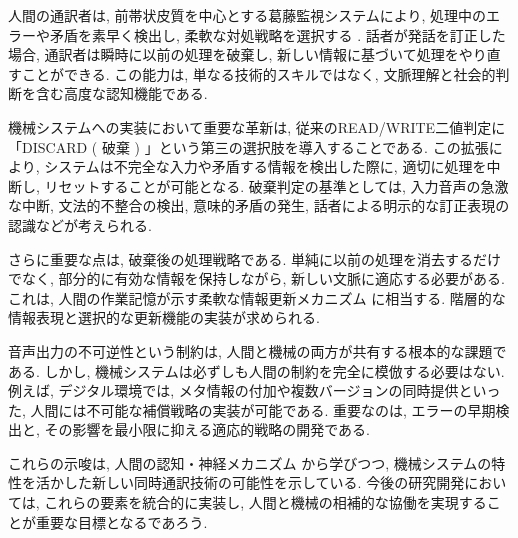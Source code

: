 人間の通訳者は, 前帯状皮質を中心とする葛藤監視システムにより, 処理中のエラーや矛盾を素早く検出し, 柔軟な対処戦略を選択する \cite{hervais2015fmri}.
話者が発話を訂正した場合, 通訳者は瞬時に以前の処理を破棄し, 新しい情報に基づいて処理をやり直すことができる.
この能力は, 単なる技術的スキルではなく, 文脈理解と社会的判断を含む高度な認知機能である.

機械システムへの実装において重要な革新は, 従来のREAD/WRITE二値判定に「DISCARD ( 破棄 ) 」という第三の選択肢を導入することである.
この拡張により, システムは不完全な入力や矛盾する情報を検出した際に, 適切に処理を中断し, リセットすることが可能となる.
破棄判定の基準としては, 入力音声の急激な中断, 文法的不整合の検出, 意味的矛盾の発生, 話者による明示的な訂正表現の認識などが考えられる.

さらに重要な点は, 破棄後の処理戦略である.
単純に以前の処理を消去するだけでなく, 部分的に有効な情報を保持しながら, 新しい文脈に適応する必要がある.
これは, 人間の作業記憶が示す柔軟な情報更新メカニズム \cite{baddeley2000episodic} に相当する.
階層的な情報表現と選択的な更新機能の実装が求められる.

音声出力の不可逆性という制約は, 人間と機械の両方が共有する根本的な課題である.
しかし, 機械システムは必ずしも人間の制約を完全に模倣する必要はない.
例えば, デジタル環境では, メタ情報の付加や複数バージョンの同時提供といった, 人間には不可能な補償戦略の実装が可能である.
重要なのは, エラーの早期検出と, その影響を最小限に抑える適応的戦略の開発である.

これらの示唆は, 人間の認知・神経メカニズム \cite{gile1995basic,seeber2011cognitive,vandeputte2018anatomical} から学びつつ, 機械システムの特性を活かした新しい同時通訳技術の可能性を示している.
今後の研究開発においては, これらの要素を統合的に実装し, 人間と機械の相補的な協働を実現することが重要な目標となるであろう.